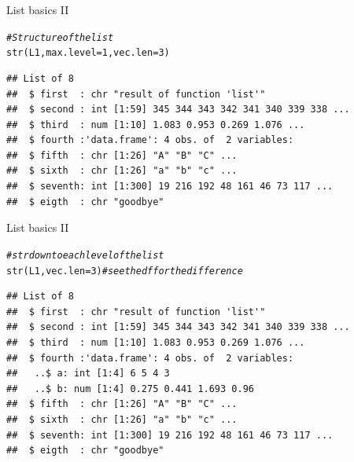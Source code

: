 \documentclass[xcolor=table,           xcolor=dvipsnames]{beamer}\usepackage[]{graphicx}\usepackage[]{color}
\makeatletter
\newcommand{\hlnum}[1]{\textcolor[rgb]{0,0,0}{#1}}
\newcommand{\hlcom}[1]{\textcolor[rgb]{0,0.392,0}{\textit{#1}}}
\newcommand{\hlstd}[1]{\textcolor[rgb]{0,0,0}{#1}}
\newcommand{\hlkwc}[1]{\textcolor[rgb]{1,0,1}{#1}}
\newcommand{\hlkwd}[1]{\textcolor[rgb]{0,0,1}{#1}}
\newenvironment{kframe}{%
 \def\at@end@of@kframe{}%
 \ifinner\ifhmode%
  \def\at@end@of@kframe{\end{minipage}}%
  \begin{minipage}{\columnwidth}%
 \fi\fi%
 \def\FrameCommand##1{\hskip\@totalleftmargin \hskip-\fboxsep
 \colorbox{shadecolor}{##1}\hskip-\fboxsep
     \hskip-\linewidth \hskip-\@totalleftmargin \hskip\columnwidth}%
 \MakeFramed {\advance\hsize-\width
   \@totalleftmargin\z@ \linewidth\hsize
   \@setminipage}}%
 {\par\unskip\endMakeFramed%
 \at@end@of@kframe}
\newenvironment{knitrout}{}{} %
\makeatother
\begin{document}
\begin{frame}[fragile]{List basics II}
\begin{knitrout}\small
{}\color{fgcolor}\begin{kframe}
\begin{alltt}
\hlcom{# Structure of the list}
\hlkwd{str}\hlstd{(L1,} \hlkwc{max.level}\hlstd{=}\hlnum{1}\hlstd{,} \hlkwc{vec.len}\hlstd{=}\hlnum{3}\hlstd{)}
\end{alltt}
\begin{verbatim}
## List of 8
##  $ first  : chr "result of function 'list'"
##  $ second : int [1:59] 345 344 343 342 341 340 339 338 ...
##  $ third  : num [1:10] 1.083 0.953 0.269 1.076 ...
##  $ fourth :'data.frame':	4 obs. of  2 variables:
##  $ fifth  : chr [1:26] "A" "B" "C" ...
##  $ sixth  : chr [1:26] "a" "b" "c" ...
##  $ seventh: int [1:300] 19 216 192 48 161 46 73 117 ...
##  $ eigth  : chr "goodbye"
\end{verbatim}
\end{kframe}
\end{knitrout}
\end{frame}


\begin{frame}[fragile]{List basics II}
\vspace{1.45em}
\begin{knitrout}\small
{}\color{fgcolor}\begin{kframe}
\begin{alltt}
\hlcom{# str down to each level of the list}
\hlkwd{str}\hlstd{(L1,} \hlkwc{vec.len}\hlstd{=}\hlnum{3}\hlstd{)} \hlcom{# see the df for the difference}
\end{alltt}
\begin{verbatim}
## List of 8
##  $ first  : chr "result of function 'list'"
##  $ second : int [1:59] 345 344 343 342 341 340 339 338 ...
##  $ third  : num [1:10] 1.083 0.953 0.269 1.076 ...
##  $ fourth :'data.frame':	4 obs. of  2 variables:
##   ..$ a: int [1:4] 6 5 4 3
##   ..$ b: num [1:4] 0.275 0.441 1.693 0.96
##  $ fifth  : chr [1:26] "A" "B" "C" ...
##  $ sixth  : chr [1:26] "a" "b" "c" ...
##  $ seventh: int [1:300] 19 216 192 48 161 46 73 117 ...
##  $ eigth  : chr "goodbye"
\end{verbatim}
\end{kframe}
\end{knitrout}
\end{frame}
\end{document}
